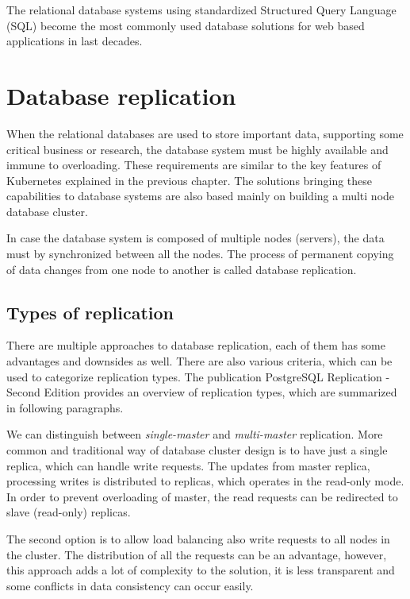\documentclass[
  digital, %
  twoside, %
  table,   %
  lof,     %
  lot,     %
]{fithesis3}
\begin{document}
The relational database systems using standardized Structured Query Language (SQL) \cite{sql_standard} become the most commonly used database solutions for web based applications in last decades.

\section{Database replication} \label{sec:db_replication}
When the relational databases are used to store important data, supporting some critical business or research, the database system must be highly available and immune to overloading. These requirements are similar to the key features of Kubernetes explained in the previous chapter. The solutions bringing these capabilities to database systems are also based mainly on building a multi node database cluster.

In case the database system is composed of multiple nodes (servers), the data must by synchronized between all the nodes. The process of permanent copying of data changes from one node to another is called database replication.

\subsection{Types of replication} \label{sec:types_of_replication}
There are multiple approaches to database replication, each of them has some advantages and downsides as well. There are also various criteria, which can be used to categorize replication types. The publication PostgreSQL Replication - Second Edition \cite{pg} provides an overview of replication types, which are summarized in following paragraphs.

We can distinguish between \textit{single-master} and  \textit{multi-master} replication. More common and traditional way of database cluster design is to have just a single replica, which can handle write requests. The updates from master replica, processing writes is distributed to replicas, which operates in the read-only mode. In order to prevent overloading of master, the read requests can be redirected to slave (read-only) replicas.

The second option is to allow load balancing also write requests to all nodes in the cluster. The distribution of all the requests can be an advantage, however, this approach adds a lot of complexity to the solution, it is less transparent and some conflicts in data consistency can occur easily.
\end{document}
